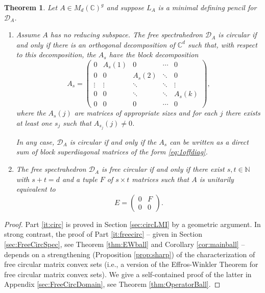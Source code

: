 \documentclass[12pt,makeidx]{amsart}
\newtheorem{theorem}{Theorem}[section]
\def\beq{\begin{equation}}
\def\eeq{\end{equation}}
\def\ben{\begin{enumerate}}
\def\een{\end{enumerate}}
\numberwithin{equation}{section}
\def\cD{ {{\mathcal D}}}
\def\C{ {\mathbb{C}} }
\def\N{ {\mathbb{N}} }
\def\cD{ {\mathcal D} }
\begin{document}
\begin{theorem} 
\label{theorem:circularmain}
 Let  $A\in M_d(\C)^g$  and 
 suppose  $L_A$ is a minimal defining pencil for $\cD_A$.
 \ben[label={\rm(\arabic*)}]
 \item
 \label{it:circ} 
    Assume $A$ has no reducing subspace. 
   The free spectrahedron
  $\cD_{A}$ is circular if and only if 
  there is an orthogonal decomposition
  of $\mathbb C^d$ such that, with respect to this decomposition, the $A_s$ have the block decomposition
\beq
\label{eq:1offdiag}
  A_s =\begin{pmatrix} 0 & A_s(1) & 0 &  \cdots  & 0 \\
       0 & 0 & A_s(2) & \ddots & 0\\
       \vdots & \vdots & \ddots & \ddots &\vdots \\
       0 & 0 & \ddots &\ddots & A_s(k) \\ 
       0 & 0 & 0 & \cdots & 0 \end{pmatrix}, 
\eeq
  where the $A_s(j)$ are matrices of appropriate sizes and for each $j$ there exists at least one $s_j$ such that $A_{s_j} (j) \neq 0$.

   In any case,  $\cD_A$ is circular if and only if  the $A_s$ can be written as a direct sum of 
block superdiagonal
   matrices of the form \eqref{eq:1offdiag}.
   
   \item 
   \label{it:freecirc} 
The free spectrahedron  $\cD_A$ is  free circular
if and only if
 there exist $s,t\in\N$ with $s+t=d$ and a tuple $F$ of $s\times t$ matrices  such that 
$A$ is unitarily equivalent to 
\beq\label{eq:pball}
E= \begin{pmatrix} 0 & F \\ 0 & 0\end{pmatrix}.
\eeq
 \een
\end{theorem}


\begin{proof}
Part \ref{it:circ} is proved in  Section \ref{sec:circLMI} 
by a  geometric argument.  
    In strong contrast, the proof of Part \ref{it:freecirc} -- given in  Section \ref{sec:FreeCircSpec}, see Theorem \ref{thm:EWball} and Corollary \ref{cor:mainball} --
depends on
a strengthening (Proposition \ref{prop:sharp})
 of the characterization \cite[Proposition 3.5]{BVM} of free circular matrix convex sets (i.e., a
  version of the Effros-Winkler Theorem \cite{EW} for free circular  matrix convex sets). We give a self-contained proof
  of the latter  in Appendix \ref{sec:FreeCircDomain},
  see Theorem \ref{thm:OperatorBall}.
\end{proof}
\end{document}
